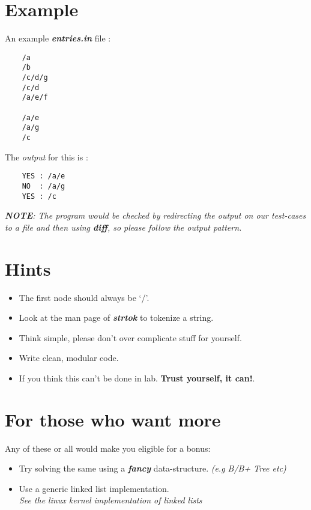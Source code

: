 \documentclass[9pt]{article}
\begin{document}
\section{Example}
An example \textit{\textbf{entries.in}} file :
\begin{verbatim}
	/a
	/b
	/c/d/g
	/c/d
	/a/e/f

	/a/e
	/a/g
	/c
\end{verbatim}
The \textit{output} for this is :
\begin{verbatim}
	YES : /a/e
	NO  : /a/g
	YES : /c
\end{verbatim}
\em{\textbf{NOTE}: The program would be checked by redirecting the output on our test-cases to a file and then using \textbf{diff}, so please follow the output pattern.} \em

\section{Hints}
\begin{itemize}
	\item The first node should always be `/'.
	\item Look at the man page of \textbf{\textit{strtok}} to tokenize a string.
	\item Think simple, please don't over complicate stuff for yourself.
	\item Write clean, modular code.
	\item If you think this can't be done in lab. \textbf{Trust yourself, it can!}.
\end{itemize}
\section{For those who want more}
Any of these or all would make you eligible for a bonus:
\begin{itemize}
	\item Try solving the same using a \textit{\textbf{fancy}} data-structure. \textit{(e.g B/B+ Tree etc)}
	\item Use a generic linked list implementation. \\
		\em{See the linux kernel implementation of linked lists} \em
\end{itemize}
\end{document}
